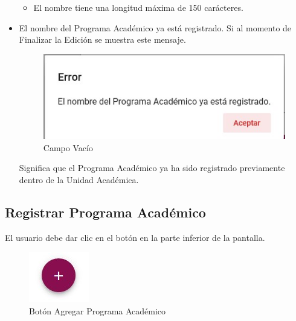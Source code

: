 \begin{itemize}
\begin{itemize}
                        \item El nombre tiene una longitud máxima de 150 carácteres.
                    \end{itemize}

                \item El nombre del Programa Académico ya está registrado.
                    Si al momento de Finalizar la Edición se muestra este mensaje.

                     \begin{figure}[H]
                    \centering
                    \hypertarget{vacio}{\includegraphics[width=0.7\linewidth]{images/SP3/Yareg}}
                    \caption{Campo Vacío}
                    \label{vacio}
                    \end{figure}

                    Significa que el Programa Académico ya ha sido registrado previamente dentro de la Unidad Académica.



            \end{itemize}
        \subsection{Registrar Programa Académico}

            El usuario debe dar clic en el botón \IUbutton{+} en la parte inferior de la pantalla.

            \begin{figure}[H]
                \centering
                \hypertarget{add}{\includegraphics[width=0.7\linewidth]{images/SP3/BtnAgregar}}
                \caption{Botón Agregar Programa Académico}
                \label{add}
            \end{figure}


